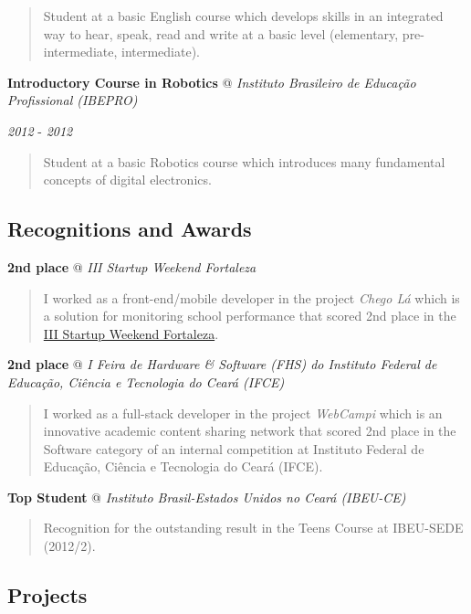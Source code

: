 \documentclass[]{article}
\begin{document}
\begin{quote}
Student at a basic English course which develops skills in an integrated
way to hear, speak, read and write at a basic level (elementary,
pre-intermediate, intermediate).
\end{quote}

\textbf{Introductory Course in Robotics} @ \emph{Instituto Brasileiro de
Educação Profissional (IBEPRO)}

\emph{2012} - \emph{2012}

\begin{quote}
Student at a basic Robotics course which introduces many fundamental
concepts of digital electronics.
\end{quote}

\subsection{Recognitions and Awards}\label{recognitions-and-awards}

\textbf{2nd place} @ \emph{III Startup Weekend Fortaleza}

\begin{quote}
I worked as a front-end/mobile developer in the project \emph{Chego Lá}
which is a solution for monitoring school performance that scored 2nd
place in the
\href{http://www.up.co/communities/brazil/fortaleza/startup-weekend/4487}{III
Startup Weekend Fortaleza}.
\end{quote}

\textbf{2nd place} @ \emph{I Feira de Hardware \& Software (FHS) do
Instituto Federal de Educação, Ciência e Tecnologia do Ceará (IFCE)}

\begin{quote}
I worked as a full-stack developer in the project \emph{WebCampi} which
is an innovative academic content sharing network that scored 2nd place
in the Software category of an internal competition at Instituto Federal
de Educação, Ciência e Tecnologia do Ceará (IFCE).
\end{quote}

\textbf{Top Student} @ \emph{Instituto Brasil-Estados Unidos no Ceará
(IBEU-CE)}

\begin{quote}
Recognition for the outstanding result in the Teens Course at IBEU-SEDE
(2012/2).
\end{quote}

\subsection{Projects}\label{projects}
\end{document}
